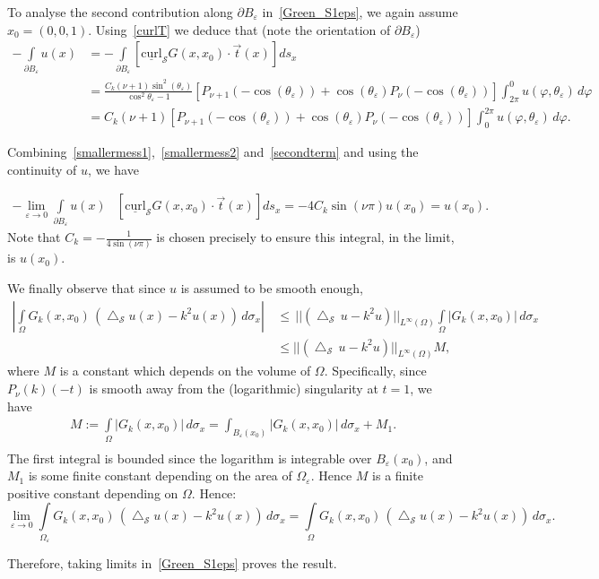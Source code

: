 \documentclass[final]{siamltex}
\newcommand{\lap}{\bigtriangleup}
\newcommand{\C}{C_k}
\renewcommand{\S} {\mathcal{S}}
\begin{document}
{To analyse the second contribution along $\partial B_{\varepsilon}$
in~\eqref{Green_S1eps}, we again assume $x_{0}=(0,0,1)$.
Using~\eqref{curlT} we deduce that (note the orientation of $\partial
B_{\varepsilon}$)
\begin{align}
  \label{secondterm}
  -\int\limits_{\partial B_{\varepsilon}} u(x)&= 
  -\int\limits_{\partial B_{\varepsilon}}
    [\underline{\mbox{curl}}_{\S}G(x,x_0)\cdot \vec{t}(x)] ds_x
    \nonumber \\
  &=\frac{\C(\nu+1) \sin^2(\theta_\varepsilon)}
         {\cos^2\theta_\varepsilon -1} 
  \left[ P_{\nu+1}(-\cos(\theta_\varepsilon)) +   
  \cos(\theta_\varepsilon) P_\nu(-\cos(\theta_\varepsilon))\right] 
  \int_{2\pi}^0 u(\varphi,\theta_{\varepsilon})\, d\varphi  \nonumber\\
  &= \C(\nu+1) \left[ P_{\nu+1}(-\cos(\theta_\varepsilon))
  + \cos(\theta_\varepsilon) P_\nu(-\cos(\theta_\varepsilon))\right] 
  \int_{0}^{2\pi} u(\varphi,\theta_{\varepsilon})\, d\varphi.
\end{align}


Combining~\eqref{smallermess1},~\eqref{smallermess2}
and~\eqref{secondterm} and using the continuity of $u$, we have

\begin{align*}
-\lim_{\varepsilon\rightarrow 0}\int\limits_{\partial B_{\varepsilon}}
u(x)& [\underline{\mbox{curl}}_{\S}G(x,x_0)\cdot \vec{t}(x)] ds_{x} = -4\C
\sin(\nu \pi)  u(x_0) = u(x_0).
\end{align*} 
Note that $\C=-\frac{1}{4\sin(\nu\pi)}$ is chosen precisely to ensure
this integral, in the limit, is $u(x_0)$.

We finally observe that since $u$ is assumed to be smooth enough,
\begin{align*} \left|\displaystyle \int\limits_{\Omega}
G_k(x,x_0)\,(\lap_{\S} u(x)-k^2u(x)) \, d\sigma_x\right|\,&\leq \,
||(\lap_{\S}\,u -k^2 u)||_{L^{\infty}(\Omega)} \int\limits_{\Omega}
|G_k(x,x_0)| \, d\sigma_x\,\\
& \leq ||(\lap_{\S}\,u -k^2 u)||_{L^{\infty}(\Omega)}M,\end{align*}
where $M$ is a constant which depends on the volume of $\Omega$.
Specifically, since $P_\nu(k)(-t)$ is smooth away from the
(logarithmic) singularity at $t=1$, we have 
\begin{align*}
M:=\int\limits_{\Omega} |G_k(x,x_0)| \, d\sigma_x=\int_{B_{\varepsilon}(x_0)}|G_k(x,x_0)| \, d\sigma_x + M_1. \\
\end{align*}
The first integral is bounded since the logarithm is integrable over ${B_{\varepsilon}(x_0)}$, and $M_1$ is some finite constant depending on the area of $\Omega_{\varepsilon}$. Hence $M$ is a finite positive constant depending on $\Omega$.
Hence:
\[\displaystyle \lim_{\varepsilon\rightarrow 0}
\int\limits_{\Omega_{\varepsilon}} G_k(x,x_0)\,(\lap_{\S} u(x)
-k^2u(x)) \,d\sigma_x = \int\limits_{\Omega} G_k(x,x_0)\,(\lap_{\S} u(x) -k^2u(x))\,d\sigma_x. \]

Therefore, taking limits in~\eqref{Green_S1eps} proves the result.}
\end{document}
